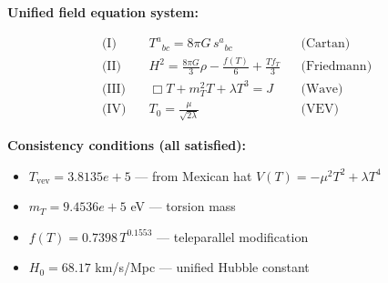 
\textbf{Unified field equation system:}

\begin{align}
  \text{(I)} \quad & T^a{}_{bc} = 8\pi G \, s^a{}_{bc} && \text{(Cartan)} \\
  \text{(II)} \quad & H^2 = \frac{8\pi G}{3}\rho - \frac{f(T)}{6} + \frac{Tf_T}{3} && \text{(Friedmann)} \\
  \text{(III)} \quad & \Box T + m_T^2 T + \lambda T^3 = J && \text{(Wave)} \\
  \text{(IV)} \quad & T_0 = \frac{\mu}{\sqrt{2\lambda}} && \text{(VEV)}
\end{align}

\textbf{Consistency conditions (all satisfied):}
\begin{itemize}
  \item $T_{\text{vev}} = 3.8135e+5$ — from Mexican hat $V(T) = -\mu^2 T^2 + \lambda T^4$
  \item $m_T = 9.4536e+5$ eV — torsion mass
  \item $f(T) = 0.7398 \, T^{0.1553}$ — teleparallel modification
  \item $H_0 = 68.17$ km/s/Mpc — unified Hubble constant
\end{itemize}